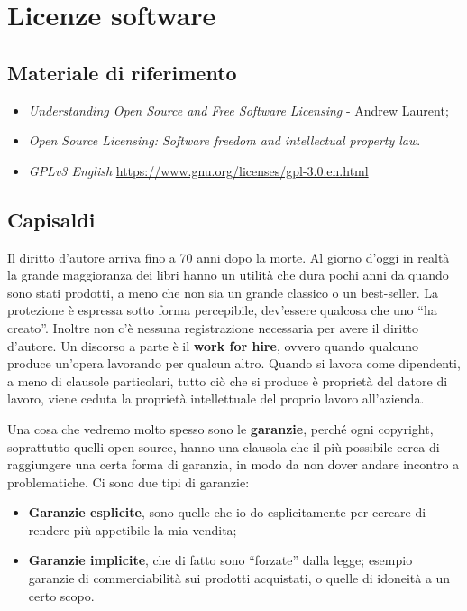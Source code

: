 \section{Licenze software}

\subsection*{Materiale di riferimento}

\begin{itemize}

\item \textit{Understanding Open Source and Free Software Licensing} - Andrew Laurent;
\item \textit{Open Source Licensing: Software freedom and intellectual property law}.
\item \textit{GPLv3 English} \url{https://www.gnu.org/licenses/gpl-3.0.en.html}

\end{itemize}

\subsection{Capisaldi}

Il diritto d'autore arriva fino a 70 anni dopo la morte. Al giorno d'oggi in realtà la grande maggioranza dei libri hanno un utilità che dura pochi anni da quando sono stati prodotti, a meno che non sia un grande classico o un best-seller. La protezione è espressa sotto forma percepibile, dev'essere qualcosa che uno ``ha creato''. Inoltre non c'è nessuna registrazione necessaria per avere il diritto d'autore. Un discorso a parte è il \textbf{work for hire}, ovvero quando qualcuno produce un'opera lavorando per qualcun altro. Quando si lavora come dipendenti, a meno di clausole particolari, tutto ciò che si produce è proprietà del datore di lavoro, viene ceduta la proprietà intellettuale del proprio lavoro all'azienda.  

Una cosa che vedremo molto spesso sono le \textbf{garanzie}, perché ogni copyright, soprattutto quelli open source, hanno una clausola che il più possibile cerca di raggiungere una certa forma di garanzia, in modo da non dover andare incontro a problematiche. Ci sono due tipi di garanzie:

\begin{itemize}

\item \textbf{Garanzie esplicite}, sono quelle che io do esplicitamente per cercare di rendere più appetibile la mia vendita; 

\item \textbf{Garanzie implicite}, che di fatto sono ``forzate'' dalla legge; esempio garanzie di commerciabilità sui prodotti acquistati, o quelle di idoneità a un certo scopo.

\end{itemize}

